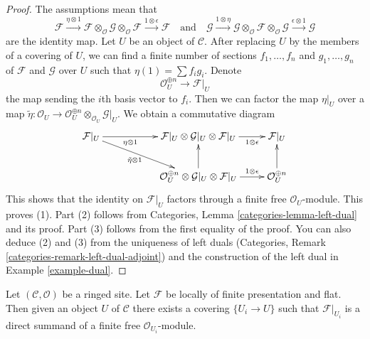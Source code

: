 \begin{proof}
The assumptions mean that
$$
\mathcal{F} \xrightarrow{\eta \otimes 1}
\mathcal{F} \otimes_\mathcal{O} \mathcal{G}
\otimes_\mathcal{O} \mathcal{F}
\xrightarrow{1 \otimes \epsilon} \mathcal{F}
\quad\text{and}\quad
\mathcal{G} \xrightarrow{1 \otimes \eta}
\mathcal{G} \otimes_\mathcal{O} \mathcal{F}
\otimes_\mathcal{O} \mathcal{G}
\xrightarrow{\epsilon \otimes 1} \mathcal{G}
$$
are the identity map. Let $U$ be an object of $\mathcal{C}$.
After replacing $U$ by the members of a covering of $U$,
we can find a finite number of sections $f_1, \ldots, f_n$
and $g_1, \ldots, g_n$ of
$\mathcal{F}$ and $\mathcal{G}$ over $U$ such that
$\eta(1) = \sum f_i g_i$. Denote
$$
\mathcal{O}_U^{\oplus n} \to \mathcal{F}|_U
$$
the map sending the $i$th basis vector to $f_i$. Then we
can factor the map $\eta|_U$ over a map
$\tilde \eta : \mathcal{O}_U \to
\mathcal{O}_U^{\oplus n} \otimes_{\mathcal{O}_U} \mathcal{G}|_U$.
We obtain a commutative diagram
$$
\xymatrix{
\mathcal{F}|_U
\ar[rr]_-{\eta \otimes 1} \ar[rrd]_-{\tilde \eta \otimes 1} & &
\mathcal{F}|_U \otimes \mathcal{G}|_U \otimes \mathcal{F}|_U
\ar[r]_-{1 \otimes \epsilon} &
\mathcal{F}|_U \\
& &
\mathcal{O}_U^{\oplus n} \otimes \mathcal{G}|_U \otimes \mathcal{F}|_U
\ar[u] \ar[r]^-{1 \otimes \epsilon} &
\mathcal{O}_U^{\oplus n} \ar[u]
}
$$
This shows that the identity on $\mathcal{F}|_U$
factors through a finite free $\mathcal{O}_U$-module.
This proves (1). Part (2) follows from
Categories, Lemma \ref{categories-lemma-left-dual} and its proof.
Part (3) follows from the first equality of the proof.
You can also deduce (2) and (3) from the uniqueness of left duals
(Categories, Remark \ref{categories-remark-left-dual-adjoint})
and the construction of the left dual in
Example \ref{example-dual}.
\end{proof}

\begin{lemma}
\label{lemma-flat-locally-finite-presentation}
Let $(\mathcal{C}, \mathcal{O})$ be a ringed site. Let $\mathcal{F}$
be locally of finite presentation and flat. Then given an object
$U$ of $\mathcal{C}$ there exists a covering $\{U_i \to U\}$ such that
$\mathcal{F}|_{U_i}$ is a direct summand of a finite free
$\mathcal{O}_{U_i}$-module.
\end{lemma}

